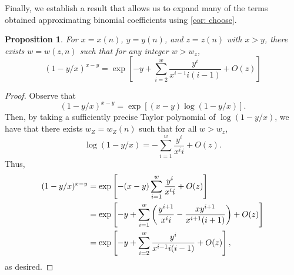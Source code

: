 \documentclass[11pt]{article}
\theoremstyle{plain}
\newtheorem{prop}[thm]{Proposition}
\begin{document}
Finally, we establish a result that allows us to expand many of the terms obtained approximating binomial coefficients using \cref{cor: choose}.

\begin{prop}\label{prop: expand log}
For $x = x(n)$, $y = y(n)$, and $z = z(n)$ with $x> y$, there exists $w = w(z,n)$ such that for any integer $w > w_z$, 
    \[
    (1 - y/x)^{x - y} = \exp\left[-y + \sum_{i = 2}^{w}\frac{y^i}{x^{i-1}i(i-1)} + O(z)\right]
    \]
\end{prop}
\begin{proof}
    Observe that 
    \[
    (1 - y/x)^{x - y} = \exp\left[(x - y)\log(1 - y/x)\right].
    \]
    Then, by taking a sufficiently precise Taylor polynomial of $\log(1 - y/x)$, we have that there exists $w_Z = w_Z(n)$ such that for all $w > w_z$,
    \[
    \log(1 - y/x) = -\sum_{i = 1}^w\frac{y^i}{x^ii} + O(z).
    \]
    Thus, 
    \begin{align}
        (1 - y/x)^{x - y} &= \exp\left[-(x - y)\sum_{i = 1}^w\frac{y^i}{x^ii} + O(z)\right]\notag\\
        &= \exp\left[-y + \sum_{i = 1}^w\left(\frac{y^{i+1}}{x^ii} - \frac{xy^{i+1}}{x^{i+1}(i+1)}\right) + O(z)\right]\notag\\
        &= \exp\left[-y + \sum_{i = 2}^w\frac{y^i}{x^{i-1}i(i-1)} + O(z)\right]\notag,
    \end{align}
    as desired.
\end{proof}
\end{document}
